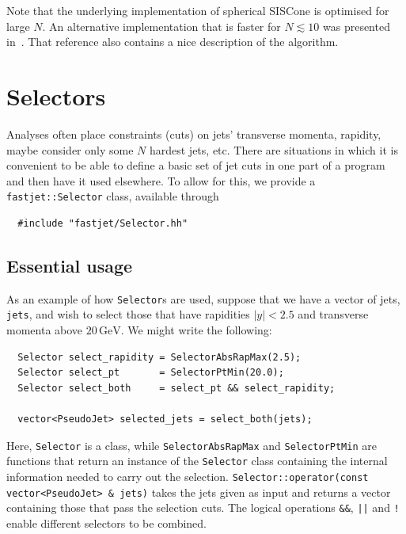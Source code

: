 \documentclass[12pt,a4]{article}
\newcommand{\ttt}[1]{{\small\texttt{#1}}}
\newcommand{\GeV}{\,\text{GeV}}
\begin{document}
Note that the underlying implementation of spherical SISCone is
optimised for large $N$. 
%
An alternative implementation that is faster for $N \lesssim 10$ was
presented in~\cite{Weinzierl:2011jx}. That reference also contains a
nice description of the algorithm.


\section{Selectors}
\label{sect:selectors}

Analyses often place constraints (cuts) on jets' transverse momenta,
rapidity, maybe consider only some $N$ hardest jets, etc.
%
There are situations in which it is convenient to be able to define
a basic set of jet cuts in one part of a program and then have it used
elsewhere.
%
To allow for this, we provide a \ttt{fastjet::Selector} class, available
through 
\begin{lstlisting}
  #include "fastjet/Selector.hh"
\end{lstlisting}

\subsection{Essential usage}


As an example of how \ttt{Selector}s are used, suppose that we  have a vector of jets, \ttt{jets},
and wish to select those that have rapidities $|y|<2.5$ and transverse
momenta above $20\GeV$. We might write the following:
\begin{lstlisting}
  Selector select_rapidity = SelectorAbsRapMax(2.5);
  Selector select_pt       = SelectorPtMin(20.0);
  Selector select_both     = select_pt && select_rapidity;
  
  vector<PseudoJet> selected_jets = select_both(jets);
\end{lstlisting}
Here, \ttt{Selector} is a class, while \ttt{SelectorAbsRapMax} and
\ttt{SelectorPtMin} are functions that return an instance of the
\ttt{Selector} class containing the internal information needed to
carry out the selection.
%
\ttt{Selector::operator(const vector<PseudoJet> \& jets)} takes the
jets given as input and returns a vector containing those that pass
the selection cuts. The logical operations \ttt{\&\&}, \ttt{||} and
\ttt{!} enable different selectors to be combined.
%
\end{document}
